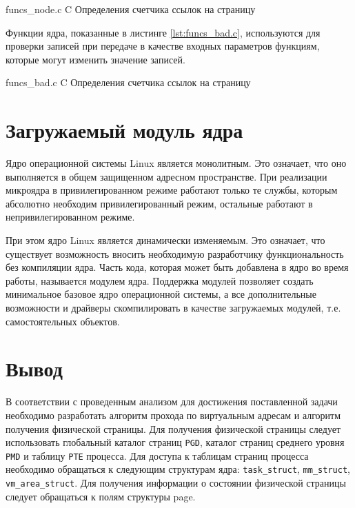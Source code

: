     {funcs_node.c}
    {C}
    {Определения счетчика ссылок на страницу}
    
Функции ядра, показанные в листинге \ref{lst:funcs_bad.c}, используются для проверки записей при передаче в качестве входных параметров функциям, которые могут изменить значение записей.
    
    {funcs_bad.c}
    {C}
    {Определения счетчика ссылок на страницу}

\section{Загружаемый модуль ядра}

Ядро операционной системы Linux является монолитным. Это означает, что оно выполняется в общем защищенном адресном пространстве. При реализации микроядра в привилегированном режиме работают только те службы, которым абсолютно необходим привилегированный режим, остальные работают в непривилегированном режиме.

При этом ядро Linux является динамически изменяемым. Это означает, что существует возможность вносить необходимую разработчику функциональность без компиляции ядра. Часть кода, которая может быть добавлена в ядро во время работы, называется модулем ядра. Поддержка модулей позволяет создать минимальное базовое ядро операционной системы, а все дополнительные возможности и драйверы скомпилировать в качестве
загружаемых модулей, т.е. самостоятельных объектов.

\section*{Вывод}

В соответствии с проведенным анализом для достижения поставленной задачи необходимо разработать алгоритм прохода по виртуальным адресам и алгоритм получения физической страницы. Для получения физической страницы следует использовать глобальный каталог страниц \texttt{PGD}, каталог страниц среднего уровня \texttt{PMD} и таблицу \texttt{PTE} процесса. Для доступа к таблицам страниц процесса необходимо обращаться к следующим структурам ядра: \texttt{task\_struct}, \texttt{mm\_struct}, \texttt{vm\_area\_struct}. Для получения информации о состоянии физической страницы следует обращаться к полям структуры page.
